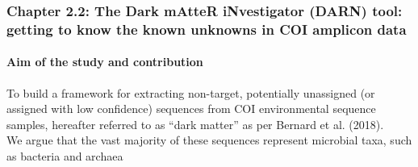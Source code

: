 \documentclass{beamer}
\begin{document}
   \begin{darkframes}
      \begin{frame}
         \frametitle{\textbf{Chapter 2.2}: The Dark mAtteR iNvestigator (DARN) tool: getting to know
         the known unknowns in COI amplicon data}
         \framesubtitle{Aim of the study and contribution}


         To build a framework for extracting non-target, potentially unassigned 
         (or assigned with low confidence) sequences from COI environmental
         sequence samples, hereafter referred to as “dark matter” as per Bernard et al. (2018). \\
         \bigskip
         We argue that the vast majority of these sequences represent
         microbial taxa, such as bacteria and archaea

      \end{frame}
   \end{darkframes}



\end{document}
